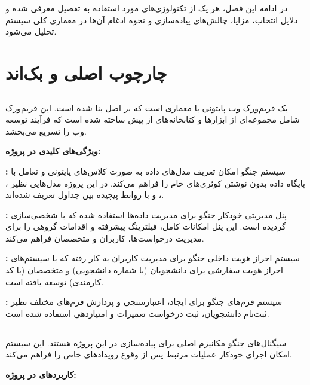 \documentclass[12pt,a4paper]{report}
\begin{document}
	در ادامه این فصل، هر یک از تکنولوژی‌های مورد استفاده به تفصیل معرفی شده و دلایل انتخاب، مزایا، چالش‌های پیاده‌سازی و نحوه ادغام آن‌ها در معماری کلی سیستم تحلیل می‌شود.
	
	\section{چارچوب اصلی و بک‌اند}
	\subsection{}
	 یک فریم‌ورک وب پایتونی با معماری  است که بر اصل  بنا شده است. این فریم‌ورک شامل مجموعه‌ای از ابزارها و کتابخانه‌های از پیش ساخته شده است که فرآیند توسعه وب را تسریع می‌بخشد.
	
	\textbf{ویژگی‌های کلیدی  در پروژه:}
	
	\textbf{:} سیستم  جنگو امکان تعریف مدل‌های داده به صورت کلاس‌های پایتونی و تعامل با پایگاه داده بدون نوشتن کوئری‌های  خام را فراهم می‌کند. در این پروژه مدل‌هایی نظیر ، ،  و  با روابط پیچیده بین جداول تعریف شده‌اند.
	
	\textbf{:} پنل مدیریتی خودکار جنگو برای مدیریت داده‌ها استفاده شده که با  شخصی‌سازی گردیده است. این پنل امکانات  کامل، فیلترینگ پیشرفته و اقدامات گروهی را برای مدیریت درخواست‌ها، کاربران و متخصصان فراهم می‌کند.
	
	\textbf{:} سیستم احراز هویت داخلی جنگو برای مدیریت کاربران به کار رفته که با سیستم‌های احراز هویت سفارشی برای دانشجویان (با شماره دانشجویی) و متخصصان (با کد کارمندی) توسعه یافته است.
	
	\textbf{:} سیستم فرم‌های جنگو برای ایجاد، اعتبارسنجی و پردازش فرم‌های مختلف نظیر ثبت‌نام دانشجویان، ثبت درخواست تعمیرات و امتیازدهی استفاده شده است.
	
	\subsection{}
	سیگنال‌های جنگو مکانیزم اصلی برای پیاده‌سازی  در این پروژه هستند. این سیستم امکان اجرای خودکار عملیات مرتبط پس از وقوع رویدادهای خاص را فراهم می‌کند.
	
	\textbf{کاربردهای  در پروژه:}
	
\end{document}
